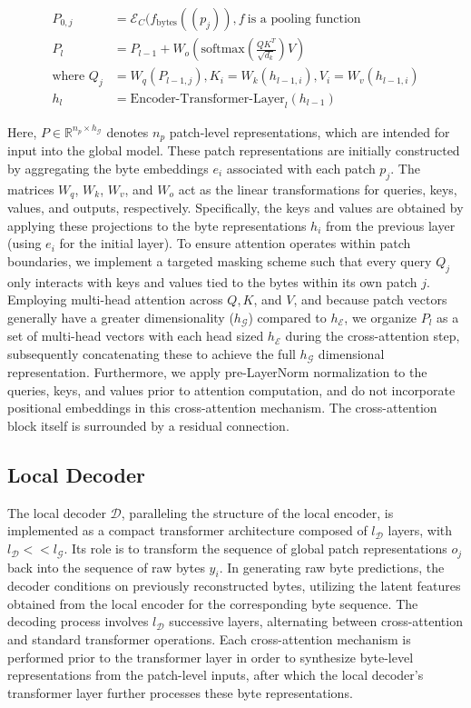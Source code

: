 \begin{align}
P_{0,j} &= \mathcal{E}_{C}(f_\text{bytes}((p_j)), f~ \text{is a pooling function} \\
P_l &= P_{l-1} + W_o\left(\text{softmax}\left(\frac{QK^T}{\sqrt{d_k}}\right)V\right) \\
\text{where } Q_j &= W_q(P_{l-1,j}), K_i = W_k(h_{l-1,i}), V_i = W_v(h_{l-1,i}) \\
h_l &= \text{Encoder-Transformer-Layer}_l(h_{l-1})
\end{align}

Here, $P \in \mathbb{R}^{n_p \times h_{\mathcal{G}}}$ denotes $n_p$ patch-level representations, which are intended for input into the global model. These patch representations are initially constructed by aggregating the byte embeddings $e_i$ associated with each patch $p_j$. The matrices $W_q$, $W_k$, $W_v$, and $W_o$ act as the linear transformations for queries, keys, values, and outputs, respectively. Specifically, the keys and values are obtained by applying these projections to the byte representations $h_i$ from the previous layer (using $e_i$ for the initial layer). To ensure attention operates within patch boundaries, we implement a targeted masking scheme such that every query $Q_j$ only interacts with keys and values tied to the bytes within its own patch $j$. Employing multi-head attention across $Q, K$, and $V$, and because patch vectors generally have a greater dimensionality ($h_{\mathcal{G}}$) compared to $h_{\mathcal{E}}$, we organize $P_l$ as a set of multi-head vectors with each head sized $h_{\mathcal{E}}$ during the cross-attention step, subsequently concatenating these to achieve the full $h_{\mathcal{G}}$ dimensional representation. Furthermore, we apply pre-LayerNorm normalization to the queries, keys, and values prior to attention computation, and do not incorporate positional embeddings in this cross-attention mechanism. The cross-attention block itself is surrounded by a residual connection.

\subsection{Local Decoder} 

The local decoder $\mathcal{D}$, paralleling the structure of the local encoder, is implemented as a compact transformer architecture composed of $l_{\mathcal{D}}$ layers, with $l_{\mathcal{D}} << l_{\mathcal{G}}$. Its role is to transform the sequence of global patch representations $o_j$ back into the sequence of raw bytes $y_i$. In generating raw byte predictions, the decoder conditions on previously reconstructed bytes, utilizing the latent features obtained from the local encoder for the corresponding byte sequence. The decoding process involves $l_{\mathcal{D}}$ successive layers, alternating between cross-attention and standard transformer operations. Each cross-attention mechanism is performed prior to the transformer layer in order to synthesize byte-level representations from the patch-level inputs, after which the local decoder’s transformer layer further processes these byte representations.

